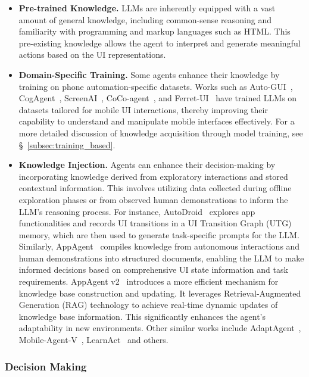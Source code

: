 \begin{itemize}
    \item \textbf{Pre-trained Knowledge.} LLMs are inherently equipped with a vast amount of general knowledge, including common-sense reasoning and familiarity with programming and markup languages such as HTML. This pre-existing knowledge allows the agent to interpret and generate meaningful actions based on the UI representations.
    
    \item \textbf{Domain-Specific Training.} Some agents enhance their knowledge by training on phone automation-specific datasets. Works such as Auto-GUI~\cite{zhang2023youautoui}, CogAgent~\cite{hong2024cogagent}, ScreenAI~\cite{baechler2024screenai}, CoCo-agent~\cite{ma2024coco}, and Ferret-UI~\cite{you2024ferret} have trained LLMs on datasets tailored for mobile UI interactions, thereby improving their capability to understand and manipulate mobile interfaces effectively. For a more detailed discussion of knowledge acquisition through model training, see \S\ \ref{subsec:training_based}.

    
    \item \textbf{Knowledge Injection.} Agents can enhance their decision-making by incorporating knowledge derived from exploratory interactions and stored contextual information. This involves utilizing data collected during offline exploration phases or from observed human demonstrations to inform the LLM's reasoning process. For instance, AutoDroid~\cite{wen2024autodroid} explores app functionalities and records UI transitions in a UI Transition Graph (UTG) memory, which are then used to generate task-specific prompts for the LLM. Similarly, AppAgent~\cite{zhang2023appagent} compiles knowledge from autonomous interactions and human demonstrations into structured documents, enabling the LLM to make informed decisions based on comprehensive UI state information and task requirements.
    AppAgent v2~\cite{li2024appagentv2} introduces a more efficient mechanism for knowledge base construction and updating. It leverages Retrieval-Augmented Generation (RAG) technology to achieve real-time dynamic updates of knowledge base information. This significantly enhances the agent's adaptability in new environments. Other similar works include AdaptAgent~\cite{verma2024adaptagent}, Mobile-Agent-V~\cite{wang2025mobileagentv}, LearnAct~\cite{liu2025learnact} and others.
\end{itemize}

\subsubsection{Decision Making}

